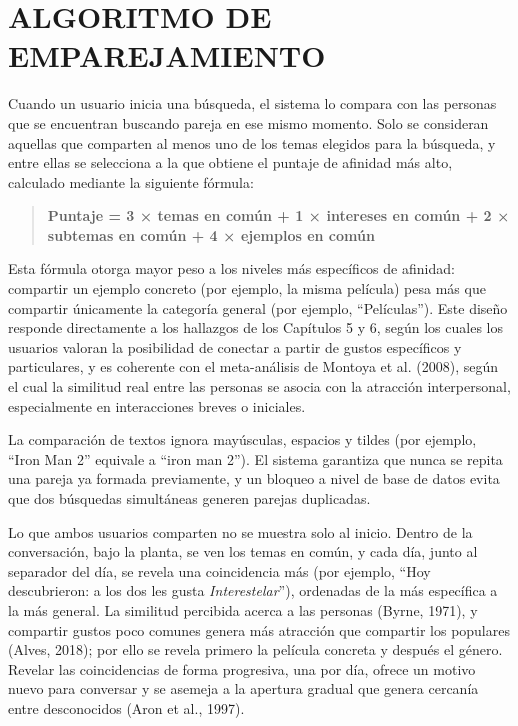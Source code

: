 \section{ALGORITMO DE EMPAREJAMIENTO}
Cuando un usuario inicia una búsqueda, el sistema lo compara con las personas que se encuentran buscando pareja en ese mismo momento. Solo se consideran aquellas que comparten al menos uno de los temas elegidos para la búsqueda, y entre ellas se selecciona a la que obtiene el puntaje de afinidad más alto, calculado mediante la siguiente fórmula:

\begin{quote}
\textbf{Puntaje = 3 × temas en común + 1 × intereses en común + 2 × subtemas en común + 4 × ejemplos en común}
\end{quote}

Esta fórmula otorga mayor peso a los niveles más específicos de afinidad: compartir un ejemplo concreto (por ejemplo, la misma película) pesa más que compartir únicamente la categoría general (por ejemplo, ``Películas''). Este diseño responde directamente a los hallazgos de los Capítulos 5 y 6, según los cuales los usuarios valoran la posibilidad de conectar a partir de gustos específicos y particulares, y es coherente con el meta-análisis de Montoya et al. (2008), según el cual la similitud real entre las personas se asocia con la atracción interpersonal, especialmente en interacciones breves o iniciales.

La comparación de textos ignora mayúsculas, espacios y tildes (por ejemplo, ``Iron Man 2'' equivale a ``iron man 2''). El sistema garantiza que nunca se repita una pareja ya formada previamente, y un bloqueo a nivel de base de datos evita que dos búsquedas simultáneas generen parejas duplicadas.

Lo que ambos usuarios comparten no se muestra solo al inicio. Dentro de la conversación, bajo la planta, se ven los temas en común, y cada día, junto al separador del día, se revela una coincidencia más (por ejemplo, ``Hoy descubrieron: a los dos les gusta \textit{Interestelar}''), ordenadas de la más específica a la más general. La similitud percibida acerca a las personas (Byrne, 1971), y compartir gustos poco comunes genera más atracción que compartir los populares (Alves, 2018); por ello se revela primero la película concreta y después el género. Revelar las coincidencias de forma progresiva, una por día, ofrece un motivo nuevo para conversar y se asemeja a la apertura gradual que genera cercanía entre desconocidos (Aron et al., 1997).

